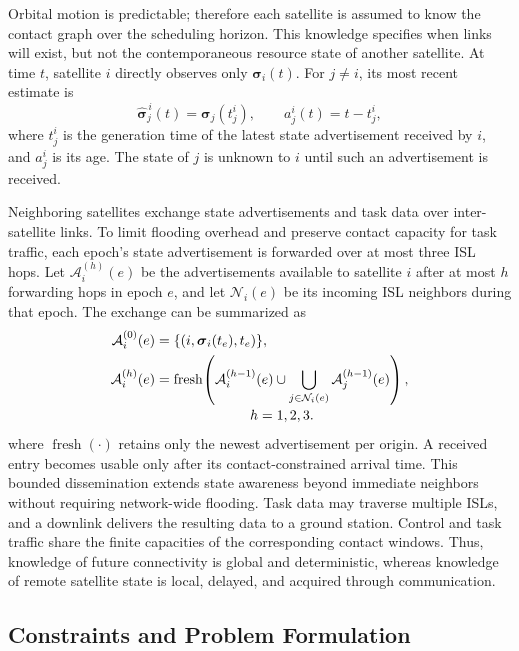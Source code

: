 \documentclass[conference]{IEEEtran}
\begin{document}
Orbital motion is predictable; therefore each satellite is assumed to know
the contact graph over the scheduling horizon. This knowledge specifies when
links will exist, but not the contemporaneous resource state of another
satellite. At time $t$, satellite $i$ directly observes only
$\boldsymbol{\sigma}_i(t)$. For $j\ne i$, its most recent estimate is
\begin{equation}
 \widehat{\boldsymbol{\sigma}}^{\,i}_j(t)
 =\boldsymbol{\sigma}_j(t^i_j),
 \qquad
 a^i_j(t)=t-t^i_j,
 \label{eq:state-estimate}
\end{equation}
where $t^i_j$ is the generation time of the latest state advertisement
received by $i$, and $a^i_j$ is its age. The state of $j$ is unknown to $i$
until such an advertisement is received.

Neighboring satellites exchange state advertisements and task data over
inter-satellite links. To limit flooding overhead and preserve contact
capacity for task traffic, each epoch's state advertisement is forwarded over
at most three ISL hops. Let $\mathcal{A}^{(h)}_i(e)$ be the advertisements
available to satellite $i$ after at most $h$ forwarding hops in epoch $e$, and
let $\mathcal{N}_i(e)$ be its incoming ISL neighbors during that epoch. The
exchange can be summarized as
\begin{align}
 \mathcal{A}^{(0)}_i(e)
   &=\{(i,\boldsymbol{\sigma}_i(t_e),t_e)\}, \nonumber\\
 \mathcal{A}^{(h)}_i(e)
   &=\operatorname{fresh}\!\left(
       \mathcal{A}^{(h-1)}_i(e)
       \cup
       \bigcup_{j\in\mathcal{N}_i(e)}
       \mathcal{A}^{(h-1)}_j(e)
     \right), \nonumber\\[-2pt]
 &\hspace{24mm} h=1,2,3.
 \label{eq:advertisement-exchange}
\end{align}
where $\operatorname{fresh}(\cdot)$ retains only the newest advertisement per
origin. A received entry becomes usable only after its contact-constrained
arrival time. This bounded dissemination extends state awareness beyond
immediate neighbors without requiring network-wide flooding. Task data may
traverse multiple ISLs, and a downlink delivers the resulting data to a ground
station.
Control and task traffic share the finite capacities of the corresponding
contact windows. Thus, knowledge of future connectivity is global and
deterministic, whereas
knowledge of remote satellite state is local, delayed, and acquired through
communication.

\subsection{Constraints and Problem Formulation}
\label{sec:formulation}
\end{document}
